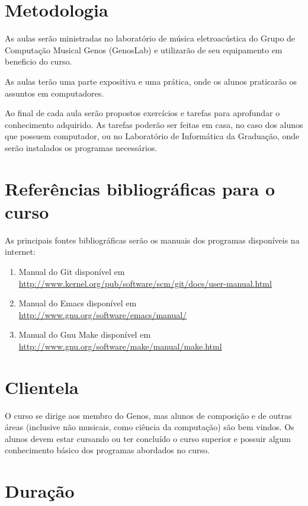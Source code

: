 \documentclass[12pt,brazil]{article}
\begin{document}
\section{Metodologia}

As aulas serão ministradas no laboratório de música eletroacústica do
Grupo de Computação Musical Genos (GenosLab) e utilizarão de seu
equipamento em beneficio do curso.

As aulas terão uma parte expositiva e uma prática, onde os alunos
praticarão os assuntos em computadores.

Ao final de cada aula serão propostos exercícios e tarefas para
aprofundar o conhecimento adquirido. As tarefas poderão ser feitas em
casa, no caso dos alunos que possuem computador, ou no Laboratório de
Informática da Graduação, onde serão instalados os programas
necessários.

\section{Referências bibliográficas para o curso}

As principais fontes bibliográficas serão os manuais dos programas
disponíveis na internet:

\begin{enumerate}
\item Manual do Git disponível em \url{http://www.kernel.org/pub/software/scm/git/docs/user-manual.html}
\item Manual do Emacs disponível em \url{http://www.gnu.org/software/emacs/manual/}
\item Manual do Gnu Make disponível em \url{http://www.gnu.org/software/make/manual/make.html}
\end{enumerate}

\section{Clientela}

O curso se dirige aos membro do Genos, mas alunos de composição e de
outras áreas (inclusive não musicais, como ciência da computação) são
bem vindos. Os alunos devem estar cursando ou ter concluído o curso
superior e possuir algum conhecimento básico dos programas abordados
no curso.

\section{Duração}
\end{document}
